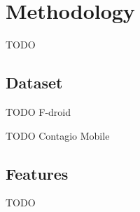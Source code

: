 \section{Methodology}
TODO

\subsection{Dataset}
TODO F-droid \cite{fdroid}

TODO Contagio Mobile \cite{contagio}

\subsection{Features}
TODO 